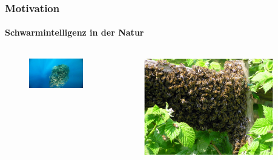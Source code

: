 \documentclass{beamer}
\begin{document}
\begin{frame}
	\frametitle{Motivation}\framesubtitle{Schwarmintelligenz in der Natur}
	\begin{columns}
		\begin{column}{0.30\textwidth}
			\begin{figure}
				\centering
				\includegraphics[width=\textwidth]{bilder/Schwarm_Fische2.jpg}
			\end{figure}
		\end{column}
		\begin{column}{0.224\textwidth}
			\begin{figure}
				\centering
				\includegraphics[width=\textwidth]{bilder/Schwarm_Bienen2.jpg}
			\end{figure}
		\end{column}
		\begin{column}{0.25\textwidth}

\end{column}
\end{columns}
\end{frame}
\end{document}
